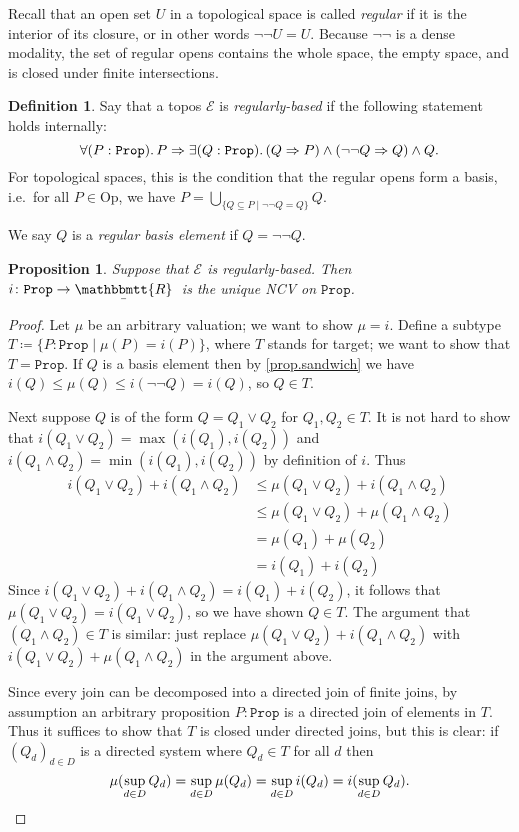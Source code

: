 \documentclass[11pt, oneside, article]{memoir}
\theoremstyle{plain}
\newtheorem{proposition}[theorem]{Proposition}
\theoremstyle{definition}
\newtheorem{definition}[theorem]{Definition}
\theoremstyle{remark}
\renewcommand{\ss}{\subseteq}
\newcommand{\const}[1]{\mathtt{#1}}
\newcommand{\Set}[1]{\mathrm{#1}}
\newcommand{\cat}[1]{\mathcal{#1}}
\newcommand{\ubar}[1]{\underaccent{\bar}{#1}}
\newcommand{\internal}[1]{\raisebox{-.03ex}{$\mathbbmtt{#1}$}}
\newcommand{\hs}{\hspace{1.1pt}}
\newcommand{\tRR}{\internal{R}\hs}
\newcommand{\tLR}{\ubar{\tRR}\hs}
\newcommand{\Prop}{\const{Prop}}
\newcommand{\Op}{\Set{Op}}
\newcommand{\imp}{\Rightarrow}
\begin{document}
Recall that an open set $U$ in a topological space is called \emph{regular} if it is the interior of its closure, or in other words $\neg\neg U=U$. Because $\neg\neg$ is a dense modality, the set of regular opens contains the whole space, the empty space, and is closed under finite intersections.

\begin{definition}
Say that a topos $\cat{E}$ is \emph{regularly-based} if the following statement holds internally:
\[\forall(P:\Prop)\ldotp P\imp\exists(Q:\Prop)\ldotp (Q\imp P)\wedge(\neg\neg Q\imp Q)\wedge Q.\]
For topological spaces, this is the condition that the regular opens form a basis, i.e.\ for all $P\in\Op$, we have $P=\bigcup_{\{Q\ss P\mid \neg\neg Q=Q\}}Q$.

We say $Q$ is a \emph{regular basis element} if $Q=\neg\neg Q$.
\end{definition}

\begin{proposition}\label{prop.unique_NCV_on_prop}
Suppose that $\cat{E}$ is regularly-based. Then $i\colon\Prop\to\tLR$ is the unique NCV on $\Prop$. 
\end{proposition}
\begin{proof}
Let $\mu$ be an arbitrary valuation; we want to show $\mu=i$. Define a subtype $T\coloneqq\{P:\Prop\mid\mu(P)=i(P)\}$, where $T$ stands for target; we want to show that $T=\Prop$. If $Q$ is a basis element then by \cref{prop.sandwich} we have $i(Q)\leq\mu(Q)\leq i(\neg\neg Q)=i(Q)$, so $Q\in T$.

Next suppose $Q$ is of the form $Q=Q_1\vee Q_2$ for $Q_1,Q_2\in T$. It is not hard to show that $i(Q_1\vee Q_2)=\max(i(Q_1),i(Q_2))$ and $i(Q_1\wedge Q_2)=\min(i(Q_1),i(Q_2))$ by definition of $i$. Thus
\begin{align*}
	i(Q_1\vee Q_2)+i(Q_1\wedge Q_2)
	&\leq\mu(Q_1\vee Q_2)+i(Q_1\wedge Q_2)\\
	&\leq \mu(Q_1\vee Q_2)+\mu(Q_1\wedge Q_2)\\
	&=\mu(Q_1)+\mu(Q_2)\\
	&=i(Q_1)+i(Q_2)
\end{align*}
Since $i(Q_1\vee Q_2)+i(Q_1\wedge Q_2)=i(Q_1)+i(Q_2)$, it follows that $\mu(Q_1\vee Q_2)=i(Q_1\vee Q_2)$, so we have shown $Q\in T$. The argument that $(Q_1\wedge Q_2)\in T$ is similar: just replace $\mu(Q_1\vee Q_2)+i(Q_1\wedge Q_2)$ with $i(Q_1\vee Q_2)+\mu(Q_1\wedge Q_2)$ in the argument above.

Since every join can be decomposed into a directed join of finite joins, by assumption an arbitrary proposition $P:\Prop$ is a directed join of elements in $T$. Thus it suffices to show that $T$ is closed under directed joins, but this is clear: if $(Q_d)_{d\in D}$ is a directed system where $Q_d\in T$ for all $d$ then
\[\mu(\sup_{d\in D}Q_d)=\sup_{d\in D}\mu(Q_d)=\sup_{d\in D} i(Q_d)=i(\sup_{d\in D}Q_d).\qedhere\]
\end{proof}
\end{document}
